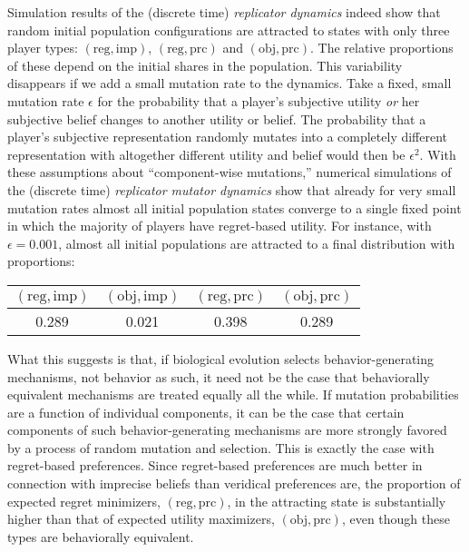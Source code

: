 \documentclass[fleqn,reqno,12pt]{article}
\theoremstyle{Satz}
\theoremstyle{Bsp}
\begin{document}
Simulation results of the (discrete time) \emph{replicator dynamics}
\citep{TaylorJonker1978:Evolutionary-St} indeed show that random initial population
configurations are attracted to states with only three player types:
$(\text{reg}, \text{imp})$, $(\text{reg}, \text{prc})$ and $(\text{obj}, \text{prc})$. The
relative proportions of these depend on the initial shares in the population. This variability disappears if
we add a small mutation rate to the dynamics. Take a fixed, small mutation rate $\epsilon$ for
the probability that a player's subjective utility \emph{or} her subjective belief changes to another
utility or belief. The probability that a player's subjective representation randomly mutates into a
completely different representation with altogether different utility and belief would
then be $\epsilon^2$. With these assumptions about ``component-wise mutations,'' numerical
simulations of the (discrete time) \emph{replicator mutator dynamics}
\citep{Nowak2006:Evolutionary-Dy} show that already for very small mutation rates almost all
initial population states converge to a single fixed point in which the majority of players have
regret-based utility. For instance, with $\epsilon = 0.001$, almost all initial populations are
attracted to a final distribution with proportions:

\begin{center}
  \begin{tabular}{cccc}
    $(\text{reg}, \text{imp})$ & $(\text{obj}, \text{imp})$ & $(\text{reg},
      \text{prc})$ & $(\text{obj}, \text{prc})$ \\ \hline
    0.289  & 0.021 &   0.398 &    0.289 
  \end{tabular}
\end{center}

What this suggests is that, if biological evolution selects behavior-generating mechanisms, not
behavior as such, it need not be the case that behaviorally equivalent mechanisms are treated
equally all the while. If mutation probabilities are a function of individual components, it can be the case that
certain components of such behavior-generating mechanisms are more strongly favored by a process of random mutation and
selection. This is exactly the case with regret-based preferences. Since regret-based preferences are much better in connection with imprecise
beliefs than veridical preferences are, the proportion of expected regret minimizers,
$(\text{reg}, \text{prc})$, in the attracting state is substantially higher than that of
expected utility maximizers, $(\text{obj}, \text{prc})$, even though these types are
behaviorally equivalent.
\end{document}
